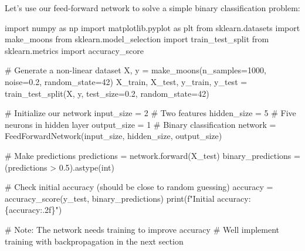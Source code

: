 \documentclass[
  letterpaper,
  DIV=11,
  numbers=noendperiod]{scrreprt}
\newenvironment{Shaded}{\begin{snugshade}}{\end{snugshade}}
\newcommand{\BuiltInTok}[1]{\textcolor[rgb]{0.00,0.23,0.31}{#1}}
\newcommand{\CommentTok}[1]{\textcolor[rgb]{0.37,0.37,0.37}{#1}}
\newcommand{\DecValTok}[1]{\textcolor[rgb]{0.68,0.00,0.00}{#1}}
\newcommand{\FloatTok}[1]{\textcolor[rgb]{0.68,0.00,0.00}{#1}}
\newcommand{\ImportTok}[1]{\textcolor[rgb]{0.00,0.46,0.62}{#1}}
\newcommand{\NormalTok}[1]{\textcolor[rgb]{0.00,0.23,0.31}{#1}}
\newcommand{\OperatorTok}[1]{\textcolor[rgb]{0.37,0.37,0.37}{#1}}
\newcommand{\SpecialCharTok}[1]{\textcolor[rgb]{0.37,0.37,0.37}{#1}}
\newcommand{\SpecialStringTok}[1]{\textcolor[rgb]{0.13,0.47,0.30}{#1}}
\begin{document}
Let's use our feed-forward network to solve a simple binary
classification problem:

\begin{Shaded}
\begin{Highlighting}[]
\ImportTok{import}\NormalTok{ numpy }\ImportTok{as}\NormalTok{ np}
\ImportTok{import}\NormalTok{ matplotlib.pyplot }\ImportTok{as}\NormalTok{ plt}
\ImportTok{from}\NormalTok{ sklearn.datasets }\ImportTok{import}\NormalTok{ make\_moons}
\ImportTok{from}\NormalTok{ sklearn.model\_selection }\ImportTok{import}\NormalTok{ train\_test\_split}
\ImportTok{from}\NormalTok{ sklearn.metrics }\ImportTok{import}\NormalTok{ accuracy\_score}

\CommentTok{\# Generate a non{-}linear dataset}
\NormalTok{X, y }\OperatorTok{=}\NormalTok{ make\_moons(n\_samples}\OperatorTok{=}\DecValTok{1000}\NormalTok{, noise}\OperatorTok{=}\FloatTok{0.2}\NormalTok{, random\_state}\OperatorTok{=}\DecValTok{42}\NormalTok{)}
\NormalTok{X\_train, X\_test, y\_train, y\_test }\OperatorTok{=}\NormalTok{ train\_test\_split(X, y, test\_size}\OperatorTok{=}\FloatTok{0.2}\NormalTok{, random\_state}\OperatorTok{=}\DecValTok{42}\NormalTok{)}

\CommentTok{\# Initialize our network}
\NormalTok{input\_size }\OperatorTok{=} \DecValTok{2}  \CommentTok{\# Two features}
\NormalTok{hidden\_size }\OperatorTok{=} \DecValTok{5}  \CommentTok{\# Five neurons in hidden layer}
\NormalTok{output\_size }\OperatorTok{=} \DecValTok{1}  \CommentTok{\# Binary classification}
\NormalTok{network }\OperatorTok{=}\NormalTok{ FeedForwardNetwork(input\_size, hidden\_size, output\_size)}

\CommentTok{\# Make predictions}
\NormalTok{predictions }\OperatorTok{=}\NormalTok{ network.forward(X\_test)}
\NormalTok{binary\_predictions }\OperatorTok{=}\NormalTok{ (predictions }\OperatorTok{\textgreater{}} \FloatTok{0.5}\NormalTok{).astype(}\BuiltInTok{int}\NormalTok{)}

\CommentTok{\# Check initial accuracy (should be close to random guessing)}
\NormalTok{accuracy }\OperatorTok{=}\NormalTok{ accuracy\_score(y\_test, binary\_predictions)}
\BuiltInTok{print}\NormalTok{(}\SpecialStringTok{f"Initial accuracy: }\SpecialCharTok{\{}\NormalTok{accuracy}\SpecialCharTok{:.2f\}}\SpecialStringTok{"}\NormalTok{)}

\CommentTok{\# Note: The network needs training to improve accuracy}
\CommentTok{\# We\textquotesingle{}ll implement training with backpropagation in the next section}
\end{Highlighting}
\end{Shaded}
\end{document}
